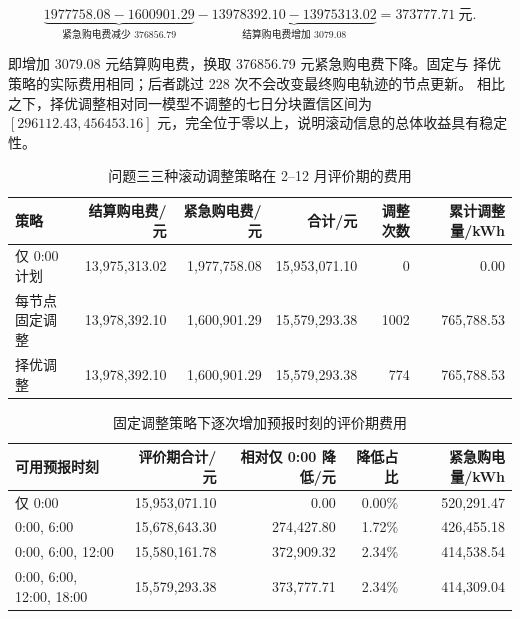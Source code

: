 \documentclass[withoutpreface,bwprint]{cumcmthesis}
\begin{document}
\begin{equation}
  \underbrace{1977758.08-1600901.29}_{\text{紧急购电费减少 }376856.79}
  -\underbrace{13978392.10-13975313.02}_{\text{结算购电费增加 }3079.08}
  =373777.71\ \text{元}.
  \label{eq:q3-saving}
\end{equation}

即增加 \num{3079.08} 元结算购电费，换取 \num{376856.79} 元紧急购电费下降。固定与
择优策略的实际费用相同；后者跳过 228 次不会改变最终购电轨迹的节点更新。
相比之下，择优调整相对同一模型不调整的七日分块置信区间为
$[\num{296112.43},\num{456453.16}]$ 元，完全位于零以上，说明滚动信息的总体收益具有稳定性。

\begin{table}[H]
  \centering
  \caption{问题三三种滚动调整策略在 2--12 月评价期的费用}
  \label{tab:q3-strategy}
  \small
  \begin{tabular}{lrrrrr}
    \toprule
    策略 & 结算购电费/元 & 紧急购电费/元 & 合计/元 & 调整次数 & 累计调整量/kWh \\
    \midrule
    仅 0:00 计划 & 13,975,313.02 & 1,977,758.08 & 15,953,071.10 & 0 & 0.00 \\
    每节点固定调整 & 13,978,392.10 & 1,600,901.29 & 15,579,293.38 & 1002 & 765,788.53 \\
    择优调整 & 13,978,392.10 & 1,600,901.29 & 15,579,293.38 & 774 & 765,788.53 \\
    \bottomrule
  \end{tabular}
\end{table}

\begin{table}[H]
  \centering
  \caption{固定调整策略下逐次增加预报时刻的评价期费用}
  \label{tab:q3-accum}
  \small
  \begin{tabular}{lrrrr}
    \toprule
    可用预报时刻 & 评价期合计/元 & 相对仅 0:00 降低/元 & 降低占比 & 紧急购电量/kWh \\
    \midrule
    仅 0:00 & 15,953,071.10 & 0.00 & 0.00\% & 520,291.47 \\
    0:00, 6:00 & 15,678,643.30 & 274,427.80 & 1.72\% & 426,455.18 \\
    0:00, 6:00, 12:00 & 15,580,161.78 & 372,909.32 & 2.34\% & 414,538.54 \\
    0:00, 6:00, 12:00, 18:00 & 15,579,293.38 & 373,777.71 & 2.34\% & 414,309.04 \\
    \bottomrule
  \end{tabular}
\end{table}
\end{document}
